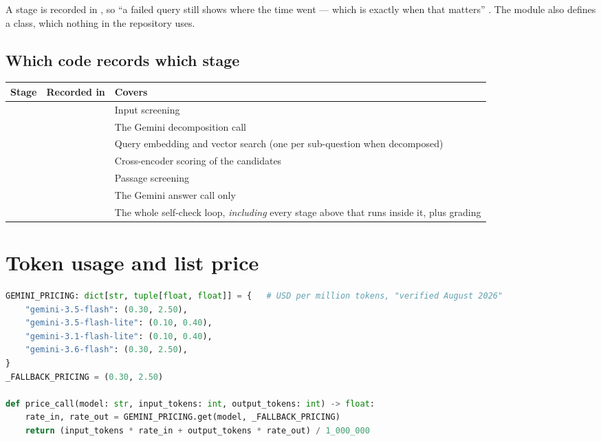 A stage is recorded in , so \enquote{a failed query still shows where the time went --- which is exactly when that matters} . The module also defines a  class, which nothing in the repository uses.

\subsection{Which code records which stage}

\begin{center}
\begin{tabularx}{\textwidth}{@{}>{\raggedright\arraybackslash}p{2.6cm}>{\raggedright\arraybackslash}p{5.2cm}L@{}}
\toprule
\textbf{Stage} & \textbf{Recorded in} & \textbf{Covers}\\
\midrule
{} &  & Input screening\\
 &  & The Gemini decomposition call\\
 &  & Query embedding and vector search (one per sub-question when decomposed)\\
 &  & Cross-encoder scoring of the candidates\\
 &  & Passage screening\\
 &  & The Gemini answer call only\\
 &  & The whole self-check loop, \emph{including} every stage above that runs inside it, plus grading\\
\bottomrule
\end{tabularx}
\end{center}

\section{Token usage and list price}

\begin{lstlisting}[language=Python]
GEMINI_PRICING: dict[str, tuple[float, float]] = {   # USD per million tokens, "verified August 2026"
    "gemini-3.5-flash": (0.30, 2.50),
    "gemini-3.5-flash-lite": (0.10, 0.40),
    "gemini-3.1-flash-lite": (0.10, 0.40),
    "gemini-3.6-flash": (0.30, 2.50),
}
_FALLBACK_PRICING = (0.30, 2.50)

def price_call(model: str, input_tokens: int, output_tokens: int) -> float:
    rate_in, rate_out = GEMINI_PRICING.get(model, _FALLBACK_PRICING)
    return (input_tokens * rate_in + output_tokens * rate_out) / 1_000_000
\end{lstlisting}

